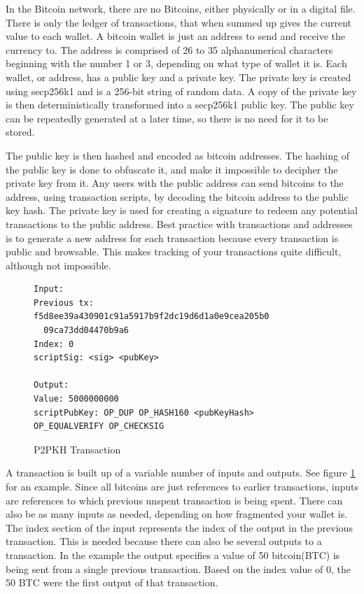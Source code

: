 \documentclass[12pt]{article}
\begin{document}
In the Bitcoin network, there are no Bitcoins, either physically or in a digital file. There is only the ledger of transactions, that when summed up gives the current value to each wallet. A bitcoin wallet is just an address to send and receive the currency to. The address is comprised of 26 to 35 alphanumerical characters beginning with the number 1 or 3, depending on what type of wallet it is. Each wallet, or address, has a public key and a private key. The private key is created using secp256k1\cite{sigalg} and is a 256-bit string of random data. A copy of the private key is then deterministically transformed into a secp256k1 public key. The public key can be repeatedly generated at a later time, so there is no need for it to be stored. 

The public key is then hashed and encoded as bitcoin addresses. The hashing of the public key is done to obfuscate it, and make it impossible to decipher the private key from it. Any users with the public address can send bitcoins to the address, using transaction scripts, by decoding the bitcoin address to the public key hash. The private key is used for creating a signature to redeem any potential transactions to the public address. Best practice with transactions and addresses is to generate a new address for each transaction because every transaction is public and browsable. This makes tracking of your transactions quite difficult, although not impossible\cite{meiklejohn2013fistful}. 

\begin{figure}[h!]
\begin{lstlisting}[numbers=none]
Input:
Previous tx: f5d8ee39a430901c91a5917b9f2dc19d6d1a0e9cea205b0
  09ca73dd04470b9a6
Index: 0
scriptSig: <sig> <pubKey>

Output:
Value: 5000000000
scriptPubKey: OP_DUP OP_HASH160 <pubKeyHash>
OP_EQUALVERIFY OP_CHECKSIG
 \end{lstlisting}
 \caption{P2PKH Transaction}
 \label{fig:transaction}
\end{figure}

A transaction is built up of a variable number of inputs and outputs. See figure \ref{fig:transaction} for an example. Since all bitcoins are just references to earlier transactions, inputs are references to which previous unspent transaction is being spent. There can also be as many inputs as needed, depending on how fragmented your wallet is. The index section of the input represents the index of the output in the previous transaction. This is needed because there can also be several outputs to a transaction. In the example the output specifies a value of 50 bitcoin(BTC) is being sent from a single previous transaction. Based on the index value of 0, the 50 BTC were the first output of that transaction. 
\end{document}
